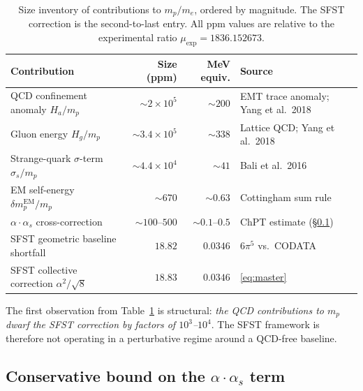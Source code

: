 \begin{table}[h]
\centering
\renewcommand{\arraystretch}{1.3}
\begin{tabular}{lrrl}
\toprule
Contribution & Size (ppm) & MeV equiv. & Source \\
\midrule
QCD confinement anomaly $H_a/m_p$ &
  $\sim 2\times10^5$ & $\sim 200$ &
  EMT trace anomaly; Yang et al.\ 2018 \\
Gluon energy $H_g/m_p$ &
  $\sim 3.4\times10^5$ & $\sim 338$ &
  Lattice QCD; Yang et al.\ 2018 \\
Strange-quark $\sigma$-term $\sigma_s/m_p$ &
  $\sim 4.4\times10^4$ & $\sim 41$ &
  Bali et al.\ 2016 \\
EM self-energy $\delta m_p^{\mathrm{EM}}/m_p$ &
  $\sim 670$ & $\sim 0.63$ &
  Cottingham sum rule \\
$\alpha\cdot\alpha_s$ cross-correction &
  $\sim 100$--$500$ & $\sim 0.1$--$0.5$ &
  ChPT estimate (§\ref{ssec:crossBound}) \\
\midrule
SFST geometric baseline shortfall &
  $18.82$ & $0.0346$ & $6\pi^5$ vs.\ CODATA \\
SFST collective correction $\alpha^2/\sqrt{8}$ &
  $18.83$ & $0.0346$ & \cref{eq:master} \\
\bottomrule
\end{tabular}
\caption{Size inventory of contributions to $m_p/m_e$, ordered by
  magnitude.  The SFST correction is the second-to-last entry.
  All ppm values are relative to the experimental ratio
  $\mu_{\exp}=1836.152673$.}
\label{tab:scales}
\end{table}

The first observation from Table~\ref{tab:scales} is structural:
\emph{the QCD contributions to $m_p$ dwarf the SFST correction by
factors of $10^3$--$10^4$}.  The SFST framework is therefore not
operating in a perturbative regime around a QCD-free baseline.

\subsection{Conservative bound on the $\alpha\cdot\alpha_s$ term}
\label{ssec:crossBound}

